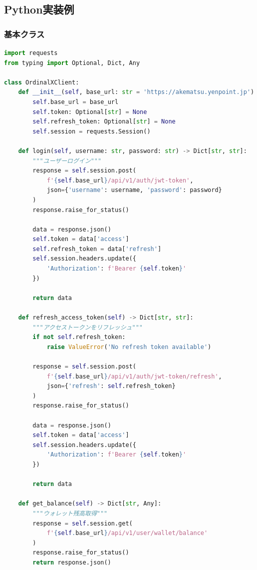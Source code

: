 \documentclass[11pt,a4paper]{ltjsarticle}  %
\begin{document}
\subsection{Python実装例}

\subsubsection{基本クラス}
\begin{lstlisting}[language=python, caption=Python実装]
import requests
from typing import Optional, Dict, Any

class OrdinalXClient:
    def __init__(self, base_url: str = 'https://akematsu.yenpoint.jp'):
        self.base_url = base_url
        self.token: Optional[str] = None
        self.refresh_token: Optional[str] = None
        self.session = requests.Session()
    
    def login(self, username: str, password: str) -> Dict[str, str]:
        """ユーザーログイン"""
        response = self.session.post(
            f'{self.base_url}/api/v1/auth/jwt-token',
            json={'username': username, 'password': password}
        )
        response.raise_for_status()
        
        data = response.json()
        self.token = data['access']
        self.refresh_token = data['refresh']
        self.session.headers.update({
            'Authorization': f'Bearer {self.token}'
        })
        
        return data
    
    def refresh_access_token(self) -> Dict[str, str]:
        """アクセストークンをリフレッシュ"""
        if not self.refresh_token:
            raise ValueError('No refresh token available')
        
        response = self.session.post(
            f'{self.base_url}/api/v1/auth/jwt-token/refresh',
            json={'refresh': self.refresh_token}
        )
        response.raise_for_status()
        
        data = response.json()
        self.token = data['access']
        self.session.headers.update({
            'Authorization': f'Bearer {self.token}'
        })
        
        return data
    
    def get_balance(self) -> Dict[str, Any]:
        """ウォレット残高取得"""
        response = self.session.get(
            f'{self.base_url}/api/v1/user/wallet/balance'
        )
        response.raise_for_status()
        return response.json()
    

\end{lstlisting}
\end{document}
